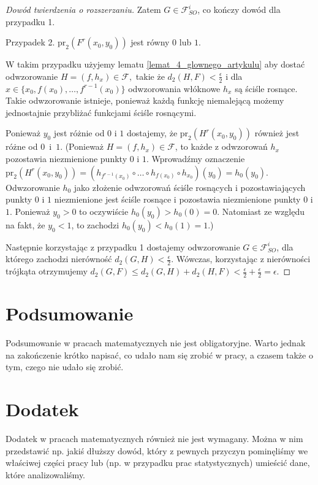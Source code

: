 \documentclass[licencjacka]{pwr_wmat_praca_dyplomowa}
\theoremstyle{plain}
\numberwithin{theorem}{chapter}
\theoremstyle{definition}
\numberwithin{theorem}{chapter}
\begin{document}
\begin{proof}[Dowód twierdzenia o rozszerzaniu]
Zatem $G \in \mathcal{F}_{SO}^i$, co kończy dowód dla przypadku 1.

Przypadek 2. $\textrm{pr}_2(F^r(x_0, y_0))$ jest równy $0$ lub $1$.

W takim przypadku użyjemy lematu \ref{lemat_4_glownego_artykulu} aby dostać odwzorowanie $H = (f, h_x) \in \mathcal{F},$ takie że $d_2(H, F) < \frac{\epsilon}{2}$ i dla $x \in \{x_0, f(x_0), \ldots, f^{r-1}(x_0)\}$ odwzorowania włóknowe $h_x$ są ściśle rosnące. Takie odwzorowanie istnieje, ponieważ każdą funkcję niemalejącą możemy jednostajnie przybliżać funkcjami ściśle rosnącymi.

 
Ponieważ $y_0$ jest różnie od $0$ i $1$ dostajemy, że $\textrm{pr}_2(H^r(x_0, y_0))$ również jest różne od $0$~i~$1$. (Ponieważ $H = (f, h_x) \in \mathcal{F}$, to każde z odwzorowań $h_x$ pozostawia niezmienione punkty $0$ i $1$. Wprowadźmy oznaczenie $\textrm{pr}_2(H^r(x_0, y_0)) = (h_{f^{r-1}(x_0)} \circ \ldots \circ h_{f(x_0)} \circ h_{x_0})(y_0) = h_0(y_0)$. Odwzorowanie $h_0$ jako złożenie odwzorowań ściśle rosnących i pozostawiających punkty $0$ i $1$ niezmienione jest ściśle rosnące i pozostawia niezmienione punkty $0$ i $1$.  Ponieważ $y_0 > 0$ to oczywiście $h_0(y_0) > h_0(0) = 0$. Natomiast ze względu na fakt, że $y_0 < 1$, to zachodzi $h_0(y_0) < h_0(1) = 1$.)
 
Następnie korzystając z przypadku 1 dostajemy odwzorowanie $G \in \mathcal{F}_{SO}^i$, dla którego zachodzi nierówność $d_2(G, H) < \frac{\epsilon}{2}$. Wówczas, korzystając z nierówności trójkąta otrzymujemy $d_2(G, F) \leq d_2(G, H) + d_2(H, F) < \frac{\epsilon}{2} + \frac{\epsilon}{2} = \epsilon$.


\end{proof}







{\backmatter \chapter{Podsumowanie}}
Podsumowanie w pracach matematycznych nie jest obligatoryjne. Warto jednak na zakończenie krótko napisać, co udało nam się zrobić w pracy, a czasem także o tym, czego nie udało się zrobić.

{\backmatter \chapter{Dodatek}}
Dodatek w pracach matematycznych również nie jest wymagany. Można w nim przedstawić np. jakiś dłuższy dowód, który z pewnych przyczyn pominęliśmy we właściwej części pracy lub (np. w przypadku prac statystycznych) umieścić dane, które analizowaliśmy.
\end{document}
